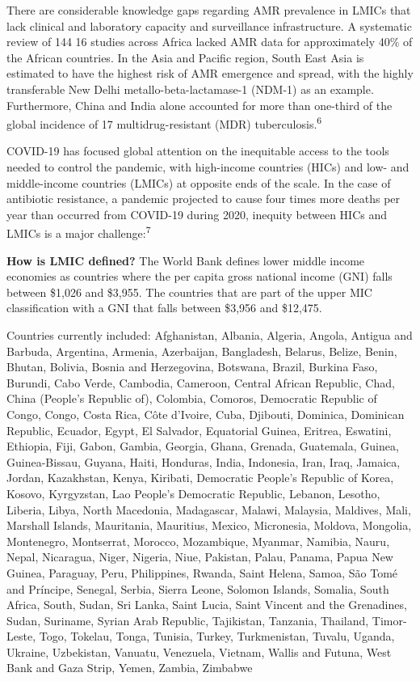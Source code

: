 \documentclass[
]{book}
\begin{document}
There are considerable knowledge gaps regarding AMR prevalence in LMICs that lack clinical and laboratory capacity and surveillance infrastructure. A systematic review of 144 16 studies across Africa lacked AMR data for approximately 40\% of the African countries. In the Asia and Pacific region, South East Asia is estimated to have the highest risk of AMR emergence and spread, with the highly transferable New Delhi metallo-beta-lactamase-1 (NDM-1) as an example. Furthermore, China and India alone accounted for more than one-third of the global incidence of 17 multidrug-resistant (MDR) tuberculosis.\textsuperscript{6}

COVID-19 has focused global attention on the inequitable access to the tools needed to control the pandemic, with high-income countries (HICs) and low- and middle-income countries (LMICs) at opposite ends of the scale. In the case of antibiotic resistance, a pandemic projected to cause four times more deaths per year than occurred from COVID-19 during 2020, inequity between HICs and LMICs is a major challenge:\textsuperscript{7}

\textbf{How is LMIC defined?} The World Bank defines lower middle income economies as countries where the per capita gross national income (GNI) falls between \$1,026 and \$3,955. The countries that are part of the upper MIC classification with a GNI that falls between \$3,956 and \$12,475.

Countries currently included: Afghanistan, Albania, Algeria, Angola, Antigua and Barbuda, Argentina, Armenia, Azerbaijan, Bangladesh, Belarus, Belize, Benin, Bhutan, Bolivia, Bosnia and Herzegovina, Botswana, Brazil, Burkina Faso, Burundi, Cabo Verde, Cambodia, Cameroon, Central African Republic, Chad, China (People's Republic of), Colombia, Comoros, Democratic Republic of Congo, Congo, Costa Rica, Côte d'Ivoire, Cuba, Djibouti, Dominica, Dominican Republic, Ecuador, Egypt, El Salvador, Equatorial Guinea, Eritrea, Eswatini, Ethiopia, Fiji, Gabon, Gambia, Georgia, Ghana, Grenada, Guatemala, Guinea, Guinea-Bissau, Guyana, Haiti, Honduras, India, Indonesia, Iran, Iraq, Jamaica, Jordan, Kazakhstan, Kenya, Kiribati, Democratic People's Republic of Korea, Kosovo, Kyrgyzstan, Lao People's Democratic Republic, Lebanon, Lesotho, Liberia, Libya, North Macedonia, Madagascar, Malawi, Malaysia, Maldives, Mali, Marshall Islands, Mauritania, Mauritius, Mexico, Micronesia, Moldova, Mongolia, Montenegro, Montserrat, Morocco, Mozambique, Myanmar, Namibia, Nauru, Nepal, Nicaragua, Niger, Nigeria, Niue, Pakistan, Palau, Panama, Papua New Guinea, Paraguay, Peru, Philippines, Rwanda, Saint Helena, Samoa, São Tomé and Príncipe, Senegal, Serbia, Sierra Leone, Solomon Islands, Somalia, South Africa, South, Sudan, Sri Lanka, Saint Lucia, Saint Vincent and the Grenadines, Sudan, Suriname, Syrian Arab Republic, Tajikistan, Tanzania, Thailand, Timor-Leste, Togo, Tokelau, Tonga, Tunisia, Turkey, Turkmenistan, Tuvalu, Uganda, Ukraine, Uzbekistan, Vanuatu, Venezuela, Vietnam, Wallis and Futuna, West Bank and Gaza Strip, Yemen, Zambia, Zimbabwe
\end{document}
